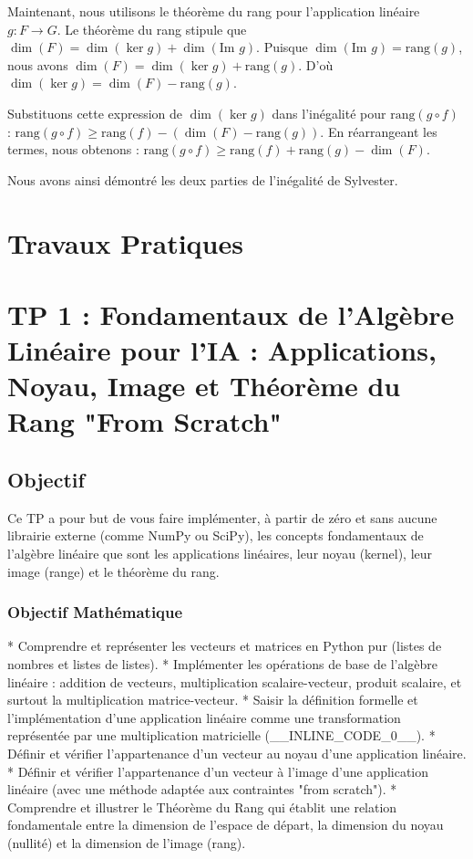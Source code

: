 \documentclass{report}
\begin{document}
        Maintenant, nous utilisons le théorème du rang pour l'application linéaire $g: F \to G$.
        Le théorème du rang stipule que $\dim(F) = \dim(\ker g) + \dim(\text{Im } g)$.
        Puisque $\dim(\text{Im } g) = \text{rang}(g)$, nous avons $\dim(F) = \dim(\ker g) + \text{rang}(g)$.
        D'où $\dim(\ker g) = \dim(F) - \text{rang}(g)$.

        Substituons cette expression de $\dim(\ker g)$ dans l'inégalité pour $\text{rang}(g \circ f)$ :
        $\text{rang}(g \circ f) \ge \text{rang}(f) - (\dim(F) - \text{rang}(g))$.
        En réarrangeant les termes, nous obtenons :
        $\text{rang}(g \circ f) \ge \text{rang}(f) + \text{rang}(g) - \dim(F)$.

    Nous avons ainsi démontré les deux parties de l'inégalité de Sylvester.

\newpage
\chapter*{Travaux Pratiques}
\chapter*{TP 1 : Fondamentaux de l'Algèbre Linéaire pour l'IA : Applications, Noyau, Image et Théorème du Rang "From Scratch"}

\section*{Objectif}

Ce TP a pour but de vous faire implémenter, à partir de zéro et sans aucune librairie externe (comme NumPy ou SciPy), les concepts fondamentaux de l'algèbre linéaire que sont les applications linéaires, leur noyau (kernel), leur image (range) et le théorème du rang.

\subsection*{Objectif Mathématique}
*   Comprendre et représenter les vecteurs et matrices en Python pur (listes de nombres et listes de listes).
*   Implémenter les opérations de base de l'algèbre linéaire : addition de vecteurs, multiplication scalaire-vecteur, produit scalaire, et surtout la multiplication matrice-vecteur.
*   Saisir la définition formelle et l'implémentation d'une application linéaire comme une transformation représentée par une multiplication matricielle (\_\_INLINE\_CODE\_0\_\_).
*   Définir et vérifier l'appartenance d'un vecteur au noyau d'une application linéaire.
*   Définir et vérifier l'appartenance d'un vecteur à l'image d'une application linéaire (avec une méthode adaptée aux contraintes "from scratch").
*   Comprendre et illustrer le Théorème du Rang qui établit une relation fondamentale entre la dimension de l'espace de départ, la dimension du noyau (nullité) et la dimension de l'image (rang).
\end{document}
